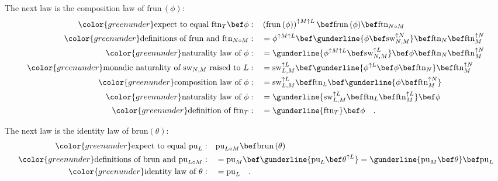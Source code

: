 The next law is the composition law of $\text{frun}\,(\phi)$:
\begin{align*}
{\color{greenunder}\text{expect to equal }\text{ftn}_{T}\bef\phi:}\quad & \left(\text{frun}\,(\phi)\right)^{\uparrow M\uparrow L}\bef\text{frun}\,(\phi)\bef\text{ftn}_{N\circ M}\\
{\color{greenunder}\text{definitions of }\text{frun}\text{ and }\text{ftn}_{N\circ M}:}\quad & =\phi^{\uparrow M\uparrow L}\bef\gunderline{\phi\bef\text{sw}_{N,M}^{\uparrow N}}\bef\text{ftn}_{N}\bef\text{ftn}_{M}^{\uparrow N}\\
{\color{greenunder}\text{naturality law of }\phi:}\quad & =\gunderline{\phi^{\uparrow M\uparrow L}\bef\text{sw}_{N,M}^{\uparrow L}}\bef\phi\bef\text{ftn}_{N}\bef\text{ftn}_{M}^{\uparrow N}\\
{\color{greenunder}\text{monadic naturality of }\text{sw}_{N,M}\text{ raised to }L:}\quad & =\text{sw}_{L,M}^{\uparrow L}\bef\gunderline{\phi^{\uparrow L}\bef\phi\bef\text{ftn}_{N}}\bef\text{ftn}_{M}^{\uparrow N}\\
{\color{greenunder}\text{composition law of }\phi:}\quad & =\text{sw}_{L,M}^{\uparrow L}\bef\text{ftn}_{L}\bef\gunderline{\phi\bef\text{ftn}_{M}^{\uparrow N}}\\
{\color{greenunder}\text{naturality law of }\phi:}\quad & =\gunderline{\text{sw}_{L,M}^{\uparrow L}\bef\text{ftn}_{L}\bef\text{ftn}_{M}^{\uparrow L}}\bef\phi\\
{\color{greenunder}\text{definition of }\text{ftn}_{T}:}\quad & =\gunderline{\text{ftn}_{T}}\bef\phi\quad.
\end{align*}

The next law is the identity law of $\text{brun}\left(\theta\right)$:
\begin{align*}
{\color{greenunder}\text{expect to equal }\text{pu}_{L}:}\quad & \text{pu}_{L\circ M}\bef\text{brun}\,(\theta)\\
{\color{greenunder}\text{definitions of }\text{brun}\text{ and }\text{pu}_{L\circ M}:}\quad & =\text{pu}_{M}\bef\gunderline{\text{pu}_{L}\bef\theta^{\uparrow L}}=\gunderline{\text{pu}_{M}\bef\theta}\bef\text{pu}_{L}\\
{\color{greenunder}\text{identity law of }\theta:}\quad & =\text{pu}_{L}\quad.
\end{align*}


